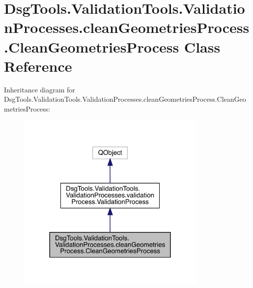 \hypertarget{class_dsg_tools_1_1_validation_tools_1_1_validation_processes_1_1clean_geometries_process_1_1_clean_geometries_process}{}\section{Dsg\+Tools.\+Validation\+Tools.\+Validation\+Processes.\+clean\+Geometries\+Process.\+Clean\+Geometries\+Process Class Reference}
\label{class_dsg_tools_1_1_validation_tools_1_1_validation_processes_1_1clean_geometries_process_1_1_clean_geometries_process}


Inheritance diagram for Dsg\+Tools.\+Validation\+Tools.\+Validation\+Processes.\+clean\+Geometries\+Process.\+Clean\+Geometries\+Process\+:
\nopagebreak
\begin{figure}[H]
\begin{center}
\leavevmode
\includegraphics[width=264pt]{class_dsg_tools_1_1_validation_tools_1_1_validation_processes_1_1clean_geometries_process_1_1_cl2481756890c0d867b3231651dc72b2c6}
\end{center}
\end{figure}


